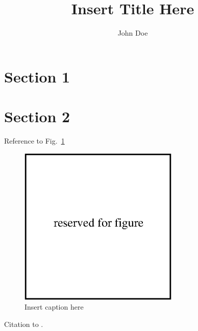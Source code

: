 \documentclass{article}
\begin{document}
\author{John Doe} 

\title{Insert Title Here}

\maketitle

\section{Section 1}
\label{sec:sec1}
\section{Section 2}
\label{sec:sec2}

Reference to Fig.~\ref{fig:placeholder}
\begin{figure}
\includegraphics[width=18pc]{placeholder.eps}\hspace{2pc}%

\caption{Insert caption here}
\label{fig:placeholder}
\end{figure}

Citation to \cite{farris14}.



\end{document}
